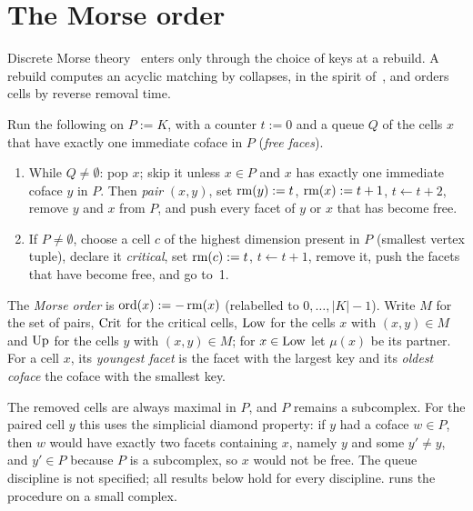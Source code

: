 \section{The Morse order}\label{sec:morse}

Discrete Morse theory~\cite{forman2002user} enters only through the choice of
keys at a rebuild. A rebuild computes an acyclic matching by collapses, in the
spirit of~\cite{benedetti2014random}, and orders cells by reverse removal time.

\begin{definition}\label{def:collapse}
Run the following on $P:=K$, with a counter $t:=0$ and a queue $Q$ of the cells
$x$ that have exactly one immediate coface in $P$ (\emph{free faces}).
\begin{enumerate}
\item While $Q\ne\emptyset$: pop $x$; skip it unless $x\in P$ and $x$ has
  exactly one immediate coface $y$ in $P$. Then \emph{pair} $(x,y)$, set
  $\operatorname{rm}(y):=t$, $\operatorname{rm}(x):=t+1$, $t\gets t+2$, remove $y$ and $x$ from $P$, and
  push every facet of $y$ or $x$ that has become free.
\item If $P\ne\emptyset$, choose a cell $c$ of the highest dimension present in
  $P$ (smallest vertex tuple), declare it \emph{critical}, set $\operatorname{rm}(c):=t$,
  $t\gets t+1$, remove it, push the facets that have become free, and go to~1.
\end{enumerate}
The \emph{Morse order} is $\operatorname{ord}(x):=-\operatorname{rm}(x)$ (relabelled to $0,\dots,|K|-1$).
Write $M$ for the set of pairs, $\mathrm{Crit}$ for the critical cells, $\mathrm{Low}$ for the
cells $x$ with $(x,y)\in M$ and $\mathrm{Up}$ for the cells $y$ with $(x,y)\in M$; for
$x\in\mathrm{Low}$ let $\mu(x)$ be its partner. For a cell $x$, its \emph{youngest facet}
is the facet with the largest key and its \emph{oldest coface} the coface with
the smallest key.
\end{definition}

The removed cells are always maximal in $P$, and $P$ remains a subcomplex. For
the paired cell $y$ this uses the simplicial diamond property: if $y$ had a
coface $w\in P$, then $w$ would have exactly two facets containing $x$, namely
$y$ and some $y'\ne y$, and $y'\in P$ because $P$ is a subcomplex, so $x$ would
not be free. The queue discipline is not specified; all results below hold for
every discipline.  runs the procedure on a small complex.

